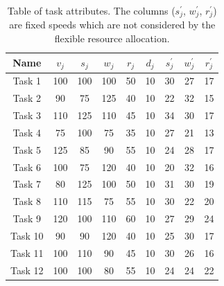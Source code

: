 \begin{table}[h]
    \begin{tabular}{|c||c|c|c|c|c||c|c|c|}
        \hline
        Name & $v_j$ & $s_j$ & $w_j$ & $r_j$ & $d_j$ &  $s^{'}_j$ & $w^{'}_j$ & $r^{'}_j$ \\ [0.5ex] \hline\hline
        Task 1 & 100 & 100 & 100 & 50 & 10 & 30 & 27 & 17 \\ \hline
        Task 2 & 90 & 75 & 125 & 40 & 10 & 22 & 32 & 15 \\ \hline
        Task 3 & 110 & 125 & 110 & 45 & 10 & 34 & 30 & 17 \\ \hline
        Task 4 & 75 & 100 & 75 & 35 & 10 & 27 & 21 & 13 \\ \hline
        Task 5 & 125 & 85 & 90 & 55 & 10 & 24 & 28 & 17 \\ \hline
        Task 6 & 100 & 75 & 120 & 40 & 10 & 20 & 32 & 16 \\ \hline
        Task 7 & 80 & 125 & 100 & 50 & 10 & 31 & 30 & 19 \\ \hline
        Task 8 & 110 & 115 & 75 & 55 & 10 & 30 & 22 & 20 \\ \hline
        Task 9 & 120 & 100 & 110 & 60 & 10 & 27 & 29 & 24 \\ \hline
        Task 10 & 90 & 90 & 120 & 40 & 10 & 25 & 30 & 17 \\ \hline
        Task 11 & 100 & 110 & 90 & 45 & 10 & 30 & 26 & 16 \\ \hline
        Task 12 & 100 & 100 & 80 & 55 & 10 & 24 & 24 & 22 \\ \hline
    \end{tabular}
    \caption{Table of task attributes. The columns ($s^{'}_j$, $w^{'}_j$, $r^{'}_j$) are fixed speeds which are not
    considered by the flexible resource allocation.}
    \label{table:example_tasks_properties}
\end{table}